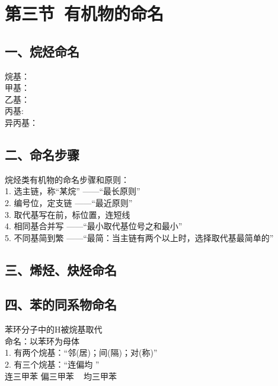 \documentclass{book}
\begin{document}
\section{第三节\ 有机物的命名}

\subsection{一、烷烃命名}
烷基： \\
\newline 
甲基： \\
乙基： \\
丙基:  \\
异丙基： 


\subsection{二、命名步骤}
烷烃类有机物的命名步骤和原则：\\
1. 选主链，称“某烷” ——“最长原则”  \\
2. 编号位，定支链 ——“最近原则” \\
3. 取代基写在前，标位置，连短线 \\
4. 相同基合并写 ——“最小取代基位号之和最小” \\
5. 不同基简到繁 ——“最简：当主链有两个以上时，选择取代基最简单的”

\subsection{三、烯烃、炔烃命名}
\newpage
\subsection{四、苯的同系物命名}
苯环分子中的H被烷基取代 \\
\newline 
命名：以苯环为母体 \\
1. 有两个烷基：“邻(居)；间(隔)；对(称)” \\
2. 有三个烷基：“连偏均 ” \\



{连三甲苯}  \quad
{}
{偏三甲苯 } \ 
{均三甲苯} 
\end{document}

